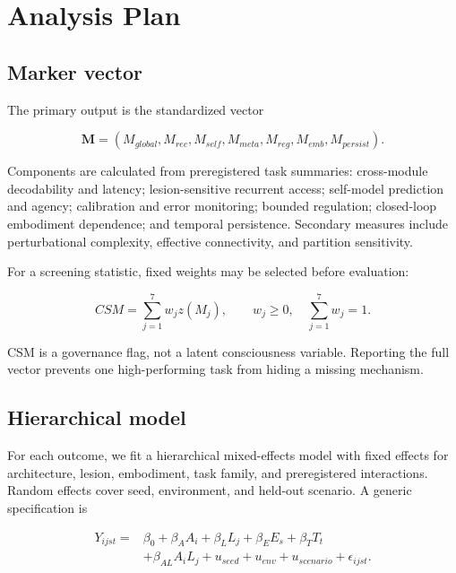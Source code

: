 \documentclass[conference]{IEEEtran}
\begin{document}
\section{Analysis Plan}

\subsection{Marker vector}

The primary output is the standardized vector

\begin{equation}
\mathbf{M}=(M_{global},M_{rec},M_{self},M_{meta},M_{reg},M_{emb},M_{persist}).
\end{equation}

Components are calculated from preregistered task summaries: cross-module decodability and latency; lesion-sensitive recurrent access; self-model prediction and agency; calibration and error monitoring; bounded regulation; closed-loop embodiment dependence; and temporal persistence. Secondary measures include perturbational complexity, effective connectivity, and partition sensitivity.

For a screening statistic, fixed weights may be selected before evaluation:

\begin{equation}
CSM=\sum_{j=1}^{7}w_j z(M_j),\qquad w_j\geq0,\quad\sum_{j=1}^{7}w_j=1.
\end{equation}

CSM is a governance flag, not a latent consciousness variable. Reporting the full vector prevents one high-performing task from hiding a missing mechanism.

\subsection{Hierarchical model}

For each outcome, we fit a hierarchical mixed-effects model with fixed effects for architecture, lesion, embodiment, task family, and preregistered interactions. Random effects cover seed, environment, and held-out scenario. A generic specification is

\begin{equation}
\begin{aligned}
Y_{ijst}={}&\beta_0+\beta_A A_i+\beta_L L_j+\beta_E E_s+\beta_T T_t\\
&+\beta_{AL}A_iL_j+u_{seed}+u_{env}+u_{scenario}+\epsilon_{ijst}.
\end{aligned}
\end{equation}
\end{document}
